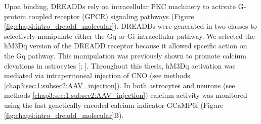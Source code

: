 Upon binding, DREADDs rely on intracellular PKC machinery to activate G-protein coupled receptor (GPCR) signaling pathways (Figure \ref{fig:chap4:intro_dreadd_molecular}). 
DREADDs were generated in two classes to selectively manipulate either the Gq or Gi intracellular pathway. 
We selected the hM3Dq version of the DREADD receptor because it allowed spceific action on the Gq pathway. 
This manipulation was previously shown to promote calcium elevations in astrocytes [\cite{mu2019}; \cite{adamsky2018astrocytic}]. 
Throughout this thesis, hM3Dq activation was mediated via intraperitoneal injection of CNO (see methods \ref{chap3:sec:1:subsec2:AAV_injection}). 
In both astrocytes and neurons (see methods \ref{chap3:sec:1:subsec2:AAV_injection}) calcium activity was monitored using the fast genetically encoded calcium indicator GCaMP6f (Figure \ref{fig:chap4:intro_dreadd_molecular}B). 
